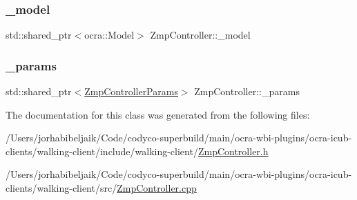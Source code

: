 \subsubsection{\texorpdfstring{\+\_\+model}{\_model}}
{\footnotesize\ttfamily std\+::shared\+\_\+ptr$<$ocra\+::\+Model$>$ Zmp\+Controller\+::\+\_\+model\hspace{0.3cm}{\ttfamily [private]}}

\hypertarget{classZmpController_a59a45aafc8a49a0d49966f7ed061a022}{}\label{classZmpController_a59a45aafc8a49a0d49966f7ed061a022} 
\subsubsection{\texorpdfstring{\+\_\+params}{\_params}}
{\footnotesize\ttfamily std\+::shared\+\_\+ptr$<$\hyperlink{structZmpControllerParams}{Zmp\+Controller\+Params}$>$ Zmp\+Controller\+::\+\_\+params\hspace{0.3cm}{\ttfamily [private]}}



The documentation for this class was generated from the following files\+:\begin{DoxyCompactItemize}
\item 
/\+Users/jorhabibeljaik/\+Code/codyco-\/superbuild/main/ocra-\/wbi-\/plugins/ocra-\/icub-\/clients/walking-\/client/include/walking-\/client/\hyperlink{ZmpController_8h}{Zmp\+Controller.\+h}\item 
/\+Users/jorhabibeljaik/\+Code/codyco-\/superbuild/main/ocra-\/wbi-\/plugins/ocra-\/icub-\/clients/walking-\/client/src/\hyperlink{ZmpController_8cpp}{Zmp\+Controller.\+cpp}\end{DoxyCompactItemize}
